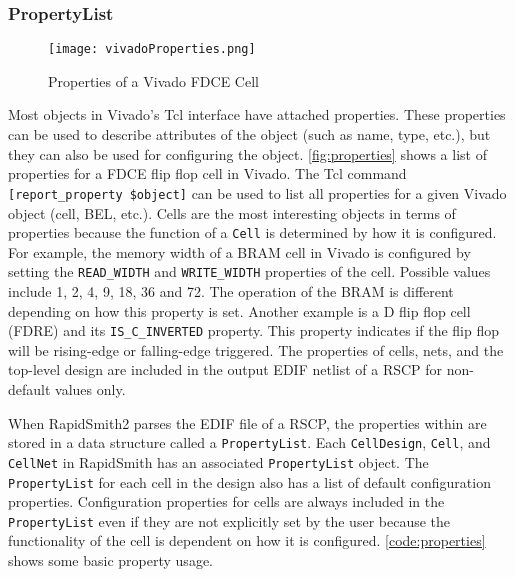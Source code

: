 \subsubsection {PropertyList}

\begin{figure}[t]
 \centering
 \texttt{[image: vivadoProperties.png]}
 \caption{Properties of a Vivado FDCE Cell}
 \label{fig:properties}
\end{figure}


Most objects in Vivado's Tcl interface have attached properties. These
properties can be used to describe attributes of the object (such as name,
type, etc.), but they can also be used for configuring the object.
\autoref{fig:properties} shows a list of properties for a FDCE flip flop
cell in Vivado. The Tcl command \texttt{[report\_property \$object]} can be used to
list all properties for a given Vivado object (cell, BEL, etc.). Cells
are the most interesting objects in terms of properties because the function
of a \texttt{Cell} is determined by how it is configured. For example, the
memory width of a BRAM cell in Vivado is configured by setting the
\texttt{READ\_WIDTH} and \texttt{WRITE\_WIDTH} properties of the cell. Possible
values include 1, 2, 4, 9, 18, 36 and 72. The operation of the BRAM is different
depending on how this property is set. Another example is a D flip flop cell
(FDRE) and its \texttt{IS\_C\_INVERTED} property. This property indicates if
the flip flop will be rising-edge or falling-edge triggered. The properties of
cells, nets, and the top-level design are included in the output EDIF netlist
of a RSCP for non-default values only.

When RapidSmith2 parses the EDIF file of a RSCP, the properties
within are stored in a data structure called a \texttt{PropertyList}. Each
\texttt{CellDesign}, \texttt{Cell}, and \texttt{CellNet} in RapidSmith has an
associated \texttt{PropertyList} object. The \texttt{PropertyList} for each
cell in the design also has a list of default configuration properties.
Configuration properties for cells are always included in the
\texttt{PropertyList} even if they are not explicitly set by the user because
the functionality of the cell is dependent on how it is configured.
\autoref{code:properties} shows some basic property usage.

